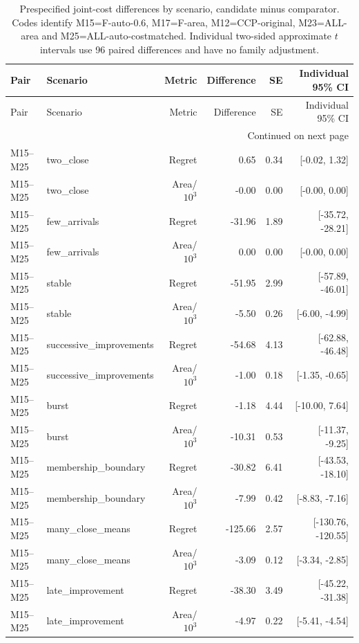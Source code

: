 \documentclass[11pt]{article}
\theoremstyle{remark}
\begin{document}
\begingroup
\fontsize{8}{10}\selectfont
\setlength{\tabcolsep}{4pt}
\begin{longtable}{llrrrr}
\caption{Prespecified joint-cost differences by scenario, candidate minus comparator. Codes identify M15=F-auto-0.6, M17=F-area, M12=CCP-original, M23=ALL-area and M25=ALL-auto-costmatched. Individual two-sided approximate $t$ intervals use 96 paired differences and have no family adjustment.}\label{tab:joint-paired}\\
\toprule
Pair & Scenario & Metric & Difference & SE & Individual 95\% CI \\
\midrule
\endfirsthead
\toprule
Pair & Scenario & Metric & Difference & SE & Individual 95\% CI \\
\midrule
\endhead
\midrule
\multicolumn{6}{r}{Continued on next page}\\
\endfoot
\bottomrule
\endlastfoot
M15--M25 & two\_close & Regret & 0.65 & 0.34 & [-0.02, 1.32] \\
M15--M25 & two\_close & Area/$10^3$ & -0.00 & 0.00 & [-0.00, 0.00] \\
M15--M25 & few\_arrivals & Regret & -31.96 & 1.89 & [-35.72, -28.21] \\
M15--M25 & few\_arrivals & Area/$10^3$ & 0.00 & 0.00 & [-0.00, 0.00] \\
M15--M25 & stable & Regret & -51.95 & 2.99 & [-57.89, -46.01] \\
M15--M25 & stable & Area/$10^3$ & -5.50 & 0.26 & [-6.00, -4.99] \\
M15--M25 & successive\_improvements & Regret & -54.68 & 4.13 & [-62.88, -46.48] \\
M15--M25 & successive\_improvements & Area/$10^3$ & -1.00 & 0.18 & [-1.35, -0.65] \\
M15--M25 & burst & Regret & -1.18 & 4.44 & [-10.00, 7.64] \\
M15--M25 & burst & Area/$10^3$ & -10.31 & 0.53 & [-11.37, -9.25] \\
M15--M25 & membership\_boundary & Regret & -30.82 & 6.41 & [-43.53, -18.10] \\
M15--M25 & membership\_boundary & Area/$10^3$ & -7.99 & 0.42 & [-8.83, -7.16] \\
M15--M25 & many\_close\_means & Regret & -125.66 & 2.57 & [-130.76, -120.55] \\
M15--M25 & many\_close\_means & Area/$10^3$ & -3.09 & 0.12 & [-3.34, -2.85] \\
M15--M25 & late\_improvement & Regret & -38.30 & 3.49 & [-45.22, -31.38] \\
M15--M25 & late\_improvement & Area/$10^3$ & -4.97 & 0.22 & [-5.41, -4.54] \\

\end{longtable}
\end{document}
